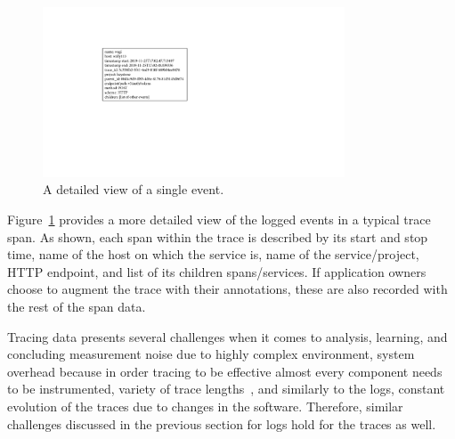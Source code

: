 \begin{figure}[htbp]
\centerline{\includegraphics[width=0.8\textwidth]{gfx/chap2/single_event.pdf}}
\caption{A detailed view of a single event.}
\label{fig:singleevent}
\end{figure}

Figure~\ref{fig:singleevent} provides a more detailed view of the logged events in a typical trace span. As shown, each span within the trace is described by its start and stop time, name of the host on which the service is, name of the service/project, HTTP endpoint, and list of  its children spans/services. If application owners choose to augment the trace with their annotations, these are also recorded with the rest of the span data. 

Tracing data presents several challenges when it comes to analysis, learning, and concluding measurement noise due to highly complex environment, system overhead because in order tracing to be effective almost every component needs to be instrumented, variety of trace lengths~\cite{nedelkoski2019anomalymultimodal}, and similarly to the logs, constant evolution of the traces due to changes in the software. Therefore, similar challenges discussed in the previous section for logs hold for the traces as well.

